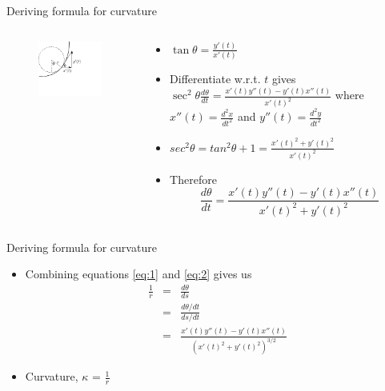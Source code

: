 \documentclass{beamer}
\begin{document}
\begin{frame}{Deriving formula for curvature}
	\begin{columns}
		\begin{column}{0.35\textwidth}			
			\begin{figure}
				\centering
				\includegraphics[width=60mm, scale=0.65]{curvature_illustration_2.png}
			\end{figure}
		\end{column}
		\begin{column}{0.75\textwidth}			

			\begin{itemize}
				\item $\tan \theta = \frac{y'(t)}{x'(t)}$ 
				\item Differentiate w.r.t. $t$ gives $\sec ^2 \theta \frac{d\theta}{dt} = \frac{x'(t) y''(t) - y'(t) x''(t)}{x'(t)^2}$
				where $x''(t)=\frac{d^2 x}{dt^2}$ and $y''(t)=\frac{d^2 y}{dt^2}$
				\item $sec^2\theta = tan^2\theta +1 = \frac{{x'(t)^2+y'(t)^2}}{x'(t)^2}$ 
				\item Therefore
				\begin{equation} \label{eq:2}
				\frac{d\theta}{dt}=\frac{x'(t) y''(t) - y'(t) x''(t)}{x'(t)^2+y'(t)^2}
				\end{equation}

			\end{itemize}
	\end{column}
\end{columns}
\end{frame}

\begin{frame}{Deriving formula for curvature}
	\begin{itemize}
		\item Combining equations \ref{eq:1} and \ref{eq:2} gives us
		\begin{eqnarray*}
			\frac1r &=& \frac{d\theta}{ds} \\
					&=& \frac{d\theta/dt}{ds/dt}  \\
			        &=& \frac{x'(t) y''(t) - y'(t) x''(t)}{\left(x'(t)^2 + y'(t)^2 \right)^{3/2}}
		\end{eqnarray*}
		
		\item Curvature, $\kappa$ =\alert{ $\frac1r $}
	\end{itemize}
	
\end{frame}
\end{document}
